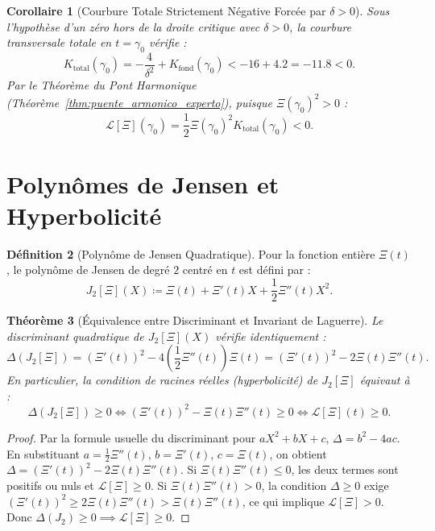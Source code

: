 \documentclass[11pt,a4paper]{article}
\newtheorem{theorem}{Théorème}[section]
\newtheorem{corollary}[theorem]{Corollaire}
\theoremstyle{definition}
\newtheorem{definition}[theorem]{Définition}
\theoremstyle{remark}
\begin{document}
\begin{corollary}[Courbure Totale Strictement Négative Forcée par $\delta > 0$]
\label{cor:curvatura_negativa_forzada}
Sous l'hypothèse d'un zéro hors de la droite critique avec $\delta > 0$, la courbure transversale totale en $t = \gamma_0$ vérifie :
\begin{equation}
K_{\mathrm{total}}(\gamma_0) = -\frac{4}{\delta^2} + K_{\mathrm{fond}}(\gamma_0) < -16 + 4.2 = -11.8 < 0.
\end{equation}
Par le Théorème du Pont Harmonique (Théorème~\ref{thm:puente_armonico_experto}), puisque $\Xi(\gamma_0)^2 > 0$ :
\begin{equation}
\label{eq:laguerre_negativo_obligatorio}
\mathcal{L}[\Xi](\gamma_0) = \frac{1}{2} \Xi(\gamma_0)^2 K_{\mathrm{total}}(\gamma_0) < 0.
\end{equation}
\end{corollary}

\section{Polynômes de Jensen et Hyperbolicité}

\begin{definition}[Polynôme de Jensen Quadratique]
Pour la fonction entière $\Xi(t)$, le polynôme de Jensen de degré $2$ centré en $t$ est défini par :
\begin{equation}
J_2[\Xi](X) \coloneqq \Xi(t) + \Xi'(t) X + \frac{1}{2} \Xi''(t) X^2.
\end{equation}
\end{definition}

\begin{theorem}[Équivalence entre Discriminant et Invariant de Laguerre]
Le discriminant quadratique de $J_2[\Xi](X)$ vérifie identiquement :
\begin{equation}
\Delta(J_2[\Xi]) = (\Xi'(t))^2 - 4\left(\frac{1}{2}\Xi''(t)\right)\Xi(t) = (\Xi'(t))^2 - 2 \Xi(t)\Xi''(t).
\end{equation}
En particulier, la condition de racines réelles (hyperbolicité) de $J_2[\Xi]$ équivaut à :
\begin{equation}
\Delta(J_2[\Xi]) \ge 0 \iff (\Xi'(t))^2 - \Xi(t)\Xi''(t) \ge 0 \iff \mathcal{L}[\Xi](t) \ge 0.
\end{equation}
\end{theorem}

\begin{proof}
Par la formule usuelle du discriminant pour $a X^2 + b X + c$, $\Delta = b^2 - 4ac$. En substituant $a = \frac{1}{2}\Xi''(t)$, $b = \Xi'(t)$, $c = \Xi(t)$, on obtient $\Delta = (\Xi'(t))^2 - 2\Xi(t)\Xi''(t)$. Si $\Xi(t)\Xi''(t) \le 0$, les deux termes sont positifs ou nuls et $\mathcal{L}[\Xi] \ge 0$. Si $\Xi(t)\Xi''(t) > 0$, la condition $\Delta \ge 0$ exige $(\Xi'(t))^2 \ge 2\Xi(t)\Xi''(t) > \Xi(t)\Xi''(t)$, ce qui implique $\mathcal{L}[\Xi] > 0$. Donc $\Delta(J_2) \ge 0 \implies \mathcal{L}[\Xi] \ge 0$.
\end{proof}
\end{document}
